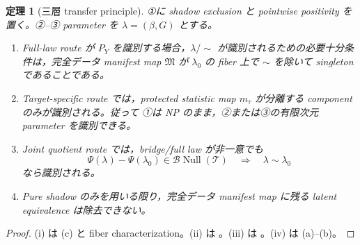 \documentclass[11pt,a4paper]{ltjsarticle}
\newtheorem{theorem}{定理}[section]
\theoremstyle{remark}
\newcommand{\Top}{\mathscr T}
\newcommand{\Bop}{\mathscr B}
\newcommand{\Null}{\operatorname{Null}}
\begin{document}
\begin{theorem}[三層 transfer principle]
\label{thm:threelayertransfer}
①に shadow exclusion と pointwise positivity を置く。②--③ parameter を $\lambda=(\beta,G)$ とする。
\begin{enumerate}[label=(\roman*)]
\item Full-law route が $P_Y$ を識別する場合，$\lambda/{\sim}$ が識別されるための必要十分条件は，完全データ manifest map $\mathfrak M$ が $\lambda_0$ の fiber 上で $\sim$ を除いて singleton であることである。
\item Target-specific route では，protected statistic map $m_\tau$ が分離する component のみが識別される。従って ①は NP のまま，②または③の有限次元 parameter を識別できる。
\item Joint quotient route では，bridge/full law が非一意でも
\[
 \Psi(\lambda)-\Psi(\lambda_0)\in\Bop\Null(\Top)
 \quad\Longrightarrow\quad
 \lambda\sim\lambda_0
\]
なら識別される。
\item Pure shadow のみを用いる限り，完全データ manifest map に残る latent equivalence は除去できない。
\end{enumerate}
\end{theorem}

\begin{proof}
(i) は (c) と fiber characterization。(ii) は 。(iii) は 。(iv) は (a)--(b)。
\end{proof}
\end{document}
